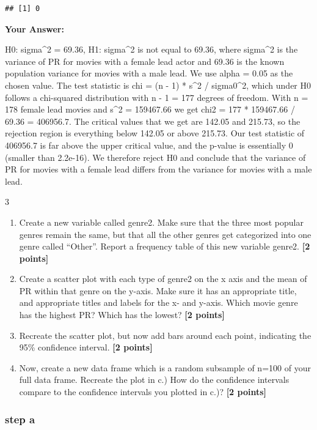\documentclass[
]{article}
\providecommand{\tightlist}{%
  \setlength{\itemsep}{0pt}\setlength{\parskip}{0pt}}
\begin{document}
\begin{verbatim}
## [1] 0
\end{verbatim}

\textbf{Your Answer:}

H0: sigma\^{}2 = 69.36, H1: sigma\^{}2 is not equal to 69.36, where
sigma\^{}2 is the variance of PR for movies with a female lead actor and
69.36 is the known population variance for movies with a male lead. We
use alpha = 0.05 as the chosen value. The test statistic is chi = (n -
1) * s\^{}2 / sigma0\^{}2, which under H0 follows a chi-squared
distribution with n - 1 = 177 degrees of freedom. With n = 178 female
lead movies and s\^{}2 = 159467.66 we get chi2 = 177 * 159467.66 / 69.36
= 406956.7. The critical values that we get are 142.05 and 215.73, so
the rejection region is everything below 142.05 or above 215.73. Our
test statistic of 406956.7 is far above the upper critical value, and
the p-value is essentially 0 (smaller than 2.2e-16). We therefore reject
H0 and conclude that the variance of PR for movies with a female lead
differs from the variance for movies with a male lead.

3

\begin{enumerate}
\def\labelenumi{\alph{enumi}.}
\tightlist
\item
  Create a new variable called genre2. Make sure that the three most
  popular genres remain the same, but that all the other genres get
  categorized into one genre called ``Other''. Report a frequency table
  of this new variable genre2. \textbf{[2 points]}
\item
  Create a scatter plot with each type of genre2 on the x axis and the
  mean of PR within that genre on the y-axis. Make sure it has an
  appropriate title, and appropriate titles and labels for the x- and
  y-axis. Which movie genre has the highest PR? Which has the lowest?
  \textbf{[2 points]}
\item
  Recreate the scatter plot, but now add bars around each point,
  indicating the 95\% confidence interval. \textbf{[2 points]}
\item
  Now, create a new data frame which is a random subsample of n=100 of
  your full data frame. Recreate the plot in c.) How do the confidence
  intervals compare to the confidence intervals you plotted in c.)?
  \textbf{[2 points]}
\end{enumerate}

\subsubsection{step a}\label{step-a}
\end{document}
